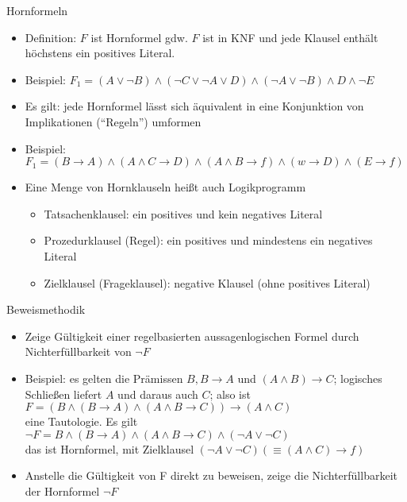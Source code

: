 \begin{frame}{Hornformeln}
	\begin{itemize}
		\item Definition: $F$ ist Hornformel gdw. $F$ ist in KNF und jede Klausel enthält höchstens ein positives Literal.
		\item Beispiel: $F_1=(A \lor \neg B) \land (\neg C \lor \neg A \lor D) \land (\neg A \lor \neg B) \land D \land \neg E$
		\item Es gilt: jede Hornformel lässt sich äquivalent in eine Konjunktion von Implikationen ("`Regeln"') umformen
		\item Beispiel: $F_1=(B \rightarrow A) \land (A \land C \rightarrow D) \land (A \land B \rightarrow f) \land (w \rightarrow D) \land (E \rightarrow f)$
		\item Eine Menge von Hornklauseln heißt auch Logikprogramm
		\begin{itemize}
			\item Tatsachenklausel: ein positives und kein negatives Literal
			\item Prozedurklausel (Regel): ein positives und mindestens ein negatives Literal
			\item Zielklausel (Frageklausel): negative Klausel (ohne positives Literal)
		\end{itemize}
	\end{itemize}
\end{frame}

\begin{frame}{Beweismethodik}
	\begin{itemize}
		\item Zeige Gültigkeit einer regelbasierten aussagenlogischen Formel durch Nichterfüllbarkeit von $\neg F$
		\item Beispiel: es gelten die Prämissen $B, B \rightarrow A$ und $(A \land B) \rightarrow C$; logisches Schließen liefert $A$ und daraus auch $C$; also ist\\
		$F=(B \land (B \rightarrow A) \land (A \land B \rightarrow C)) \rightarrow (A \land C)$\\
		eine Tautologie. Es gilt\\
		$\neg F = B \land (B \rightarrow A) \land (A \land B \rightarrow C) \land (\neg A \lor \neg C)$\\
		das ist Hornformel, mit Zielklausel $(\neg A \lor \neg C) (\equiv (A \land C) \rightarrow f)$
		\item Anstelle die Gültigkeit von F direkt zu beweisen, zeige die Nichterfüllbarkeit der Hornformel $\neg F$
	\end{itemize}
\end{frame}

